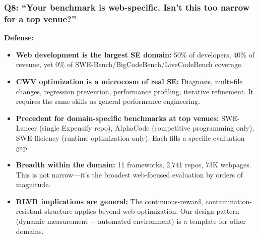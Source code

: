 \subsubsection{Q8: ``Your benchmark is web-specific. Isn't this too narrow for a top venue?''}
\textbf{Defense:}
\begin{itemize}
    \item \textbf{Web development is the largest SE domain:} 50\% of developers, 40\% of revenue, yet 0\% of SWE-Bench/BigCodeBench/LiveCodeBench coverage. 
    \item \textbf{CWV optimization is a microcosm of real SE:} Diagnosis, multi-file changes, regression prevention, performance profiling, iterative refinement. It requires the same skills as general performance engineering. 
    \item \textbf{Precedent for domain-specific benchmarks at top venues:} SWE-Lancer (single Expensify repo), AlphaCode (competitive programming only), SWE-fficiency (runtime optimization only). Each fills a specific evaluation gap. 
    \item \textbf{Breadth within the domain:} 11 frameworks, 2,741 repos, 73K webpages. This is not narrow---it's the broadest web-focused evaluation by orders of magnitude.
    \item \textbf{RLVR implications are general:} The continuous-reward, contamination-resistant structure applies beyond web optimization. Our design pattern (dynamic measurement + automated environment) is a template for other domains. 
\end{itemize}

